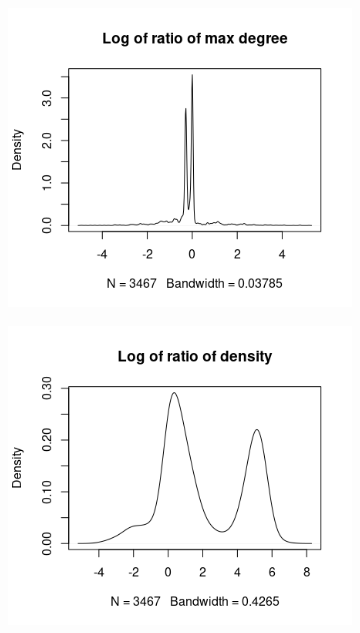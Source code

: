 \documentclass{l4proj}
\theoremstyle{definition}
\theoremstyle{remark}
\begin{document}
\begin{figure}
  \begin{subfigure}[t]{0.49\textwidth}
    \centering
    \includegraphics[width=\textwidth]{images/sip_ratio_maxdeg.png}
  \end{subfigure}
  \begin{subfigure}[t]{0.49\textwidth}
    \centering
    \includegraphics[width=\textwidth]{images/sip_ratio_density.png}
  \end{subfigure}
  \begin{subfigure}[t]{0.49\textwidth}

\end{subfigure}
\end{figure}
\end{document}
